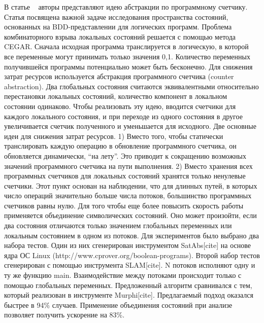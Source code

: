В статье ~\cite{Basler:2009} авторы представляют идею абстракции по программному счетчику. Статья посвящена важной задаче исследования пространства состояний, основанных на BDD-представлении для логических программ. Проблема комбинаторного взрыва локальных состояний решается с помощью метода CEGAR. 
Сначала исходная программа транслируется в логическую, в которой все переменные могут принимать только значения {0,1}. Количество переменных получившейся программы потенциально может быть бесконечно. 
Для снижения затрат ресурсов используется абстракция программного счетчика (counter abstraction). Два глобальных состояния считаются эквивалентными относительно перестановки локальных состояний, количество компонент в локальном состоянии одинаково. Чтобы реализовать эту идею, вводится счетчики для каждого локального состояния, и при переходе из одного состояния в другое увеличивается счетчик полученного и уменьшается для исходного. 
Две основные идеи для снижения затрат ресурсов. 
1) Вместо того, чтобы статически транслировать каждую операцию в обновление программного счетчика, он обновляется динамически, “на лету”. Это приводит к сокращению возможных значений программного счетчика на пути выполнения.
2) Вместо хранения всех программных счетчиков для локальных состояний хранятся только ненулевые счетчики. Этот пункт основан на наблюдении, что для длинных путей, в которых число операций значительно больше числа потоков, большинство программных счетчиков равны нулю.
Для того чтобы еще более повысить скорость работы применяется объединение символических состояний. Оно может произойти, если два состояния отличаются только значением глобальных переменных или локальным состоянием в одном из потоков. 
Для экспериментов было выбрано два набора тестов. Один из них сгенерирован инструментом SatAbs[cite] на основе ядра ОС Linux (http://www.cprover.org/boolean-programs). Второй набор тестов сгенерирован с помощью инструмента SLAM[cite]. N потоков исполняют одну и ту же функцию main. Взаимодействие между потоками происходит только с помощью глобальных переменных. Предложенный алгоритм сравнивался с тем, который реализован в инструменте Murphi[cite]. Предлагаемый подход оказался быстрее в 94\% случаев. Применение объединения состояний при анализе позволяет получить ускорение на 83\%. 


